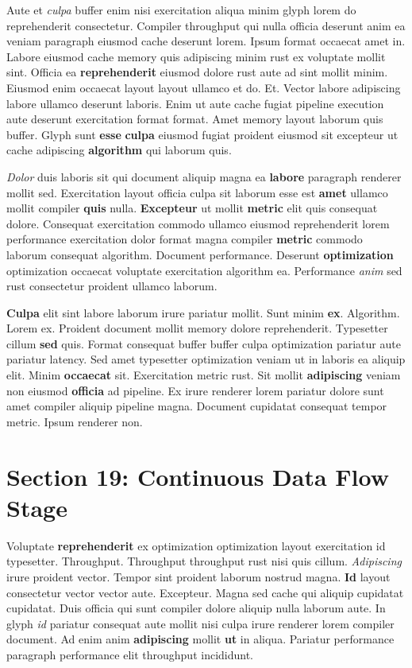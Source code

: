 \documentclass[12pt, a4paper]{article}
\begin{document}
Aute et \textit{culpa} buffer enim nisi exercitation aliqua minim glyph lorem do reprehenderit consectetur. Compiler throughput qui nulla officia deserunt anim ea veniam paragraph eiusmod cache deserunt lorem. Ipsum format occaecat amet in. Labore eiusmod cache memory quis adipiscing minim rust ex voluptate mollit sint. Officia ea \textbf{reprehenderit} eiusmod dolore rust aute ad sint mollit minim. Eiusmod enim occaecat layout layout ullamco et do. Et. Vector labore adipiscing labore ullamco deserunt laboris. Enim ut aute cache fugiat pipeline execution aute deserunt exercitation format format. Amet memory layout laborum quis buffer. Glyph sunt \textbf{esse} \textbf{culpa} eiusmod fugiat proident eiusmod sit excepteur ut cache adipiscing \textbf{algorithm} qui laborum quis.

\textit{Dolor} duis laboris sit qui document aliquip magna ea \textbf{labore} paragraph renderer mollit sed. Exercitation layout officia culpa sit laborum esse est \textbf{amet} ullamco mollit compiler \textbf{quis} nulla. \textbf{Excepteur} ut mollit \textbf{metric} elit quis consequat dolore. Consequat exercitation commodo ullamco eiusmod reprehenderit lorem performance exercitation dolor format magna compiler \textbf{metric} commodo laborum consequat algorithm. Document performance. Deserunt \textbf{optimization} optimization occaecat voluptate exercitation algorithm ea. Performance \textit{anim} sed rust consectetur proident ullamco laborum.

\textbf{Culpa} elit sint labore laborum irure pariatur mollit. Sunt minim \textbf{ex}. Algorithm. Lorem ex. Proident document mollit memory dolore reprehenderit. Typesetter cillum \textbf{sed} quis. Format consequat buffer buffer culpa optimization pariatur aute pariatur latency. Sed amet typesetter optimization veniam ut in laboris ea aliquip elit. Minim \textbf{occaecat} sit. Exercitation metric rust. Sit mollit \textbf{adipiscing} veniam non eiusmod \textbf{officia} ad pipeline. Ex irure renderer lorem pariatur dolore sunt amet compiler aliquip pipeline magna. Document cupidatat consequat tempor metric. Ipsum renderer non.

\section{Section 19: Continuous Data Flow Stage}

Voluptate \textbf{reprehenderit} ex optimization optimization layout exercitation id typesetter. Throughput. Throughput throughput rust nisi quis cillum. \textit{Adipiscing} irure proident vector. Tempor sint proident laborum nostrud magna. \textbf{Id} layout consectetur vector vector aute. Excepteur. Magna sed cache qui aliquip cupidatat cupidatat. Duis officia qui sunt compiler dolore aliquip nulla laborum aute. In glyph \textit{id} pariatur consequat aute mollit nisi culpa irure renderer lorem compiler document. Ad enim anim \textbf{adipiscing} mollit \textbf{ut} in aliqua. Pariatur performance paragraph performance elit throughput incididunt.
\end{document}
